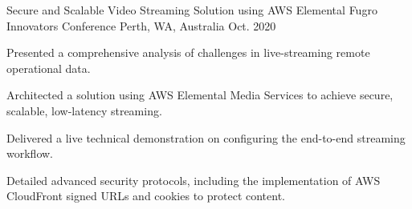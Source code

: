 

\begin{cventries}
  \cventry
    {Secure and Scalable Video Streaming Solution using AWS Elemental} %
    {Fugro Innovators Conference} %
    {Perth, WA, Australia} %
    {Oct. 2020} %
    {
      \begin{cvitems} %
        \item {Presented a comprehensive analysis of challenges in live-streaming remote operational data.}
        \item {Architected a solution using AWS Elemental Media Services to achieve secure, scalable, low-latency streaming.}
        \item {Delivered a live technical demonstration on configuring the end-to-end streaming workflow.}
        \item {Detailed advanced security protocols, including the implementation of AWS CloudFront signed URLs and cookies to protect content.}
      \end{cvitems}
    }
\end{cventries}
